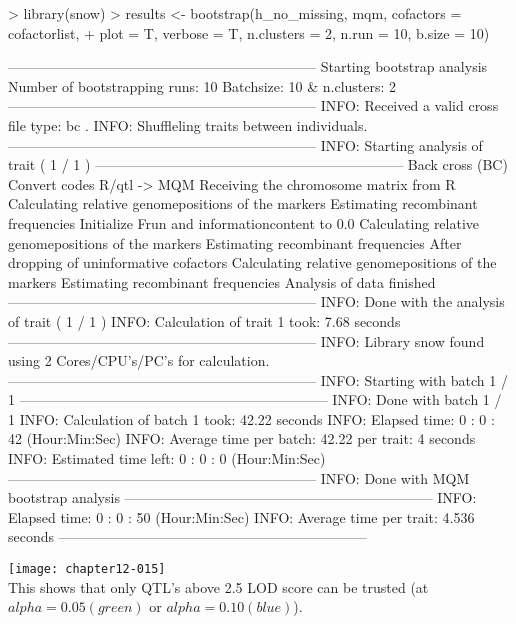 \documentclass[a4paper]{article}
\begin{document}
\begin{Schunk}
\begin{Sinput}
> library(snow)
> results <- bootstrap(h_no_missing, mqm, cofactors = cofactorlist, 
+     plot = T, verbose = T, n.clusters = 2, n.run = 10, b.size = 10)
\end{Sinput}
\begin{Soutput}
------------------------------------------------------------------
Starting bootstrap analysis
Number of bootstrapping runs: 10 
Batchsize: 10  & n.clusters: 2 
------------------------------------------------------------------
INFO: Received a valid cross file type: bc .
INFO: Shuffleling traits between individuals.
------------------------------------------------------------------
INFO: Starting analysis of trait ( 1 / 1 )
------------------------------------------------------------------
Back cross (BC)
Convert codes R/qtl -> MQM
Receiving the chromosome matrix from R
Calculating relative genomepositions of the markers
Estimating recombinant frequencies
Initialize Frun and informationcontent to 0.0
Calculating relative genomepositions of the markers
Estimating recombinant frequencies
After dropping of uninformative cofactors
Calculating relative genomepositions of the markers
Estimating recombinant frequencies
Analysis of data finished
------------------------------------------------------------------
INFO: Done with the analysis of trait ( 1 / 1 )
INFO: Calculation of trait 1 took: 7.68  seconds
------------------------------------------------------------------
INFO: Library snow found using  2  Cores/CPU's/PC's for calculation.
------------------------------------------------------------------
INFO: Starting with batch 1 / 1 
------------------------------------------------------------------
INFO: Done with batch 1 / 1 
INFO: Calculation of batch 1 took: 42.22 seconds
INFO: Elapsed time: 0 : 0 : 42 (Hour:Min:Sec)
INFO: Average time per batch: 42.22  per trait: 4 seconds
INFO: Estimated time left: 0 : 0 : 0 (Hour:Min:Sec)
------------------------------------------------------------------
INFO: Done with MQM bootstrap analysis
------------------------------------------------------------------
INFO: Elapsed time: 0 : 0 : 50 (Hour:Min:Sec)
INFO: Average time per trait: 4.536 seconds
------------------------------------------------------------------
\end{Soutput}
\end{Schunk}
\texttt{[image: chapter12-015]}
\\
This shows that only QTL's above 2.5 LOD score can be trusted (at $alpha=0.05 (green)$ or $alpha=0.10 (blue)$).
\end{document}
